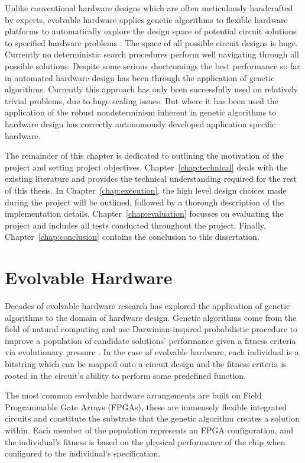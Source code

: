 Unlike conventional hardware designs which are often meticulously handcrafted
by experts, evolvable hardware applies genetic algorithms to
flexible hardware platforms to automatically explore the design space of potential
circuit solutions to specified hardware problems \cite{541893}.
The space of all possible circuit designs is huge. Currently no deterministic
search procedures perform well navigating through all possible solutions.
Despite some serious shortcomings the best performance so far in automated
hardware design has been through the application of genetic algorithms.
Currently this approach has only been successfully used on relatively
trivial problems, due to huge scaling issues. But where it has been used
the application of the
robust nondeterminism inherent in genetic algorithms to hardware design
has correctly autonomously developed application specific hardware.

The remainder of this chapter is dedicated to outlining the motivation of the
project and setting project objectives. Chapter~\ref{chap:technical} deals with
the existing literature and provides the technical understanding required for the
rest of this thesis. In Chapter~\ref{chap:execution}, the high level design choices
made during the project will be outlined, followed by a thorough description of
the implementation details. Chapter~\ref{chap:evaluation} focusses on evaluating
the project and includes all tests conducted throughout the project. Finally,
Chapter~\ref{chap:conclusion} contains the conclusion to this dissertation.

\section{Evolvable Hardware \label{s:ehw}}
Decades of evolvable hardware research has explored the application of genetic algorithms to
the domain of hardware design. Genetic algorithms come from the field of natural
computing and use Darwinian-inspired probabilistic procedure to improve a population
of candidate solutions'
performance given a fitness criteria via evolutionary pressure \cite{Goldberg:1989:GAS:534133}.
In the case of evolvable hardware,
each individual is a bitstring which can be mapped onto a circuit design
and the fitness criteria is rooted
in the circuit's ability to perform some predefined function.

The most common evolvable hardware arrangements
are built on Field Programmable Gate Arrays (FPGAs), these are immensely
flexible integrated circuits and constitute the substrate that the genetic
algorithm creates a solution within. Each member of the population
represents an FPGA configuration, and the individual's fitness is based on the
physical performance of the chip when configured to the individual's specification.

